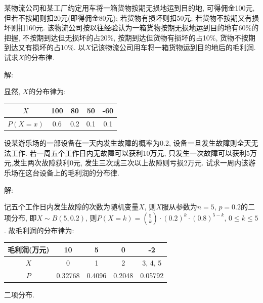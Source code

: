 \documentclass[standard]{ExBook}
\renewenvironment{shaded}{%
  \def\FrameCommand{\fboxsep=\FrameSep \colorbox{shadecolor}}%
  \MakeFramed{\advance\hsize-\width \FrameRestore}%
}{%
  \endMakeFramed
}
\begin{document}
\begin{qitems}
\vspace{2.5cm-5em}

    \begin{bbox}
    \begin{shaded}
        \qitem
某物流公司和某工厂约定用车将一箱货物按期无损地运到目的地, 可得佣金100元, 但若不按期则扣20元(即得佣金80元); 若货物有损坏则扣50元; 若货物不按期又有损坏则扣160元. 该物流公司按以往经验认为一箱货物按期无损地运到目的地有60\%的把握, 不按期到达但无损坏的占20\%, 按期到达但货物有损坏的占10\%, 货物不按期到达又有损坏的占10\%. 以$X$记该物流公司用车将一箱货物运到目的地后的毛利润. 试求$X$的分布律.
    \end{shaded}
    \end{bbox}

\vspace{\dimexpr2.5cm-5em\relax}

解: 

显然, $X$的分布律为: 
\begin{center}
\setlength{\tabcolsep}{38pt}
\begin{tabular}{c|c|c|c|c}
\hline
$X$ & 100 & 80 & 50 & -60 \\
\hline
$P(X=x)$ & 0.6 & 0.2 & 0.1 & 0.1 \\
\hline
\end{tabular}
\end{center}

\vspace{2.5cm-5em}

    \begin{bbox}
    \begin{shaded}
        \qitem
设某游乐场的一部设备在一天内发生故障的概率为0.2, 设备一旦发生故障则全天无法工作. 若一周五个工作日内无故障可以获利10万元, 只发生一次故障可以获利5万元,发生两次故障获利0元, 发生三次或三次以上故障则亏损2万元. 试求一周内该游乐场在这台设备上的毛利润的分布律.
    \end{shaded}
    \end{bbox}

\vspace{\dimexpr2.5cm-5em\relax}

解: 

记五个工作日内发生故障的次数为随机变量$X$, 则$X$服从参数为$n=5$, $p=0.2$的二项分布, 即$X\sim B(5,0.2)$, 则$P(X=k)=\binom{5}{k}\cdot(0.2)^k\cdot(0.8)^{5-k}$, $0 \leq k \leq 5$. 故毛利润的分布律为:
\begin{center}
\setlength{\tabcolsep}{26pt}
\begin{tabular}{c|c|c|c|c}
\hline
毛利润(万元) & 10 & 5 & 0 & -2 \\
\hline
$X$ & 0 & 1 & 2 & 3, 4, 5 \\
\hline
$P$ & 0.32768 & 0.4096 & 0.2048 & 0.05792 \\
\hline
\end{tabular}
\end{center}
\textcolor{themeColor}{\selectfont {} 二项分布.}


\end{qitems}
\end{document}
